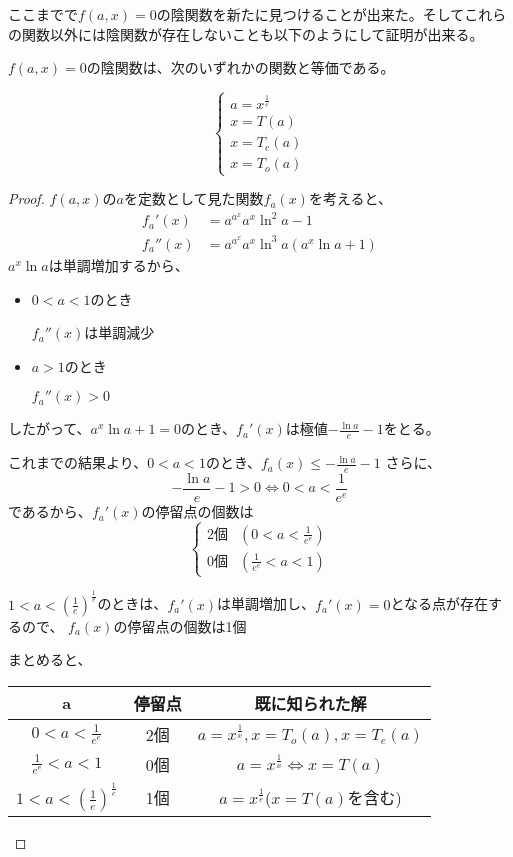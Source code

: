 	ここまでで$f(a,x)=0$の陰関数を新たに見つけることが出来た。そしてこれらの関数以外には陰関数が存在しないことも以下のようにして証明が出来る。
	\begin{theorem}
	\label{th:all_implicit_function}
		$f(a,x)=0$の陰関数は、次のいずれかの関数と等価である。
		
		\[
		\left \{
			\begin{array}{l}
				a = x^{\frac{1}{e}} \\
				x = T(a) \\
				x = T_e(a) \\
				x = T_o(a)
			\end{array}
		\right.
		\]
	\end{theorem}
	\begin{proof}
		$f(a,x)$の$a$を定数として見た関数$f_a(x)$を考えると、
		\begin{align*}
			f_a'(x) &= {a^{a^x}}{a^x}{\ln^2 a} - 1 \\
			f_a''(x)&= {a^{a^x}}{a^x}{\ln^3 a}(a^x\ln a + 1)
		\end{align*}
		$a^x\ln a$は単調増加するから、
		
		\begin{itemize}
			\item $0 < a < 1$のとき
			
				$f_a''(x)$は単調減少
			\item $a > 1$のとき
			
				$f_a''(x) > 0$
		\end{itemize}
		したがって、$a^x\ln a + 1 = 0$のとき、$f_a'(x)$は極値$-\frac{\ln a}{e} - 1$をとる。
		
		これまでの結果より、$0 < a < 1$のとき、$f_a(x) \leq -\frac{\ln a}{e} - 1$
		さらに、
		\[
			 -\frac{\ln a}{e} - 1 > 0 
			 \iff 0 < a < \frac{1}{e^e}
		\]
		であるから、$f_a'(x)$の停留点の個数は
		\[
			\begin{cases}
				\text{2個} & (0 < a < \frac{1}{e^e}) \\
				\text{0個} & (\frac{1}{e^e} < a < 1)
			\end{cases}
		\]
		
		$1 < a < \left ( \frac{1}{e} \right )^{\frac{1}{e}}$のときは、$f_a'(x)$は単調増加し、$f_a'(x)=0$となる点が存在するので、
		$f_a(x)$の停留点の個数は1個
		
		まとめると、
		\begin{table}
		\begin{center}
		\begin{tabular}{ccc}
			a & 停留点 & 既に知られた解 \\
			\hline
			$0 < a < \frac{1}{e^e}$ & 2個 & $a = x^{\frac{1}{x}},x = T_o(a),x = T_e(a)$ \\
			$\frac{1}{e^e} < a < 1$ & 0個 & $a = x^{\frac{1}{x}} \iff x = T(a)$ \\
			$1 < a < \left ( \frac{1}{e} \right )^{\frac{1}{e}}$ & 1個 & $a = x^{\frac{1}{e}}$($x = T(a)$を含む)
		\end{tabular}
		\end{center}
		\end{table}
		

\end{proof}
